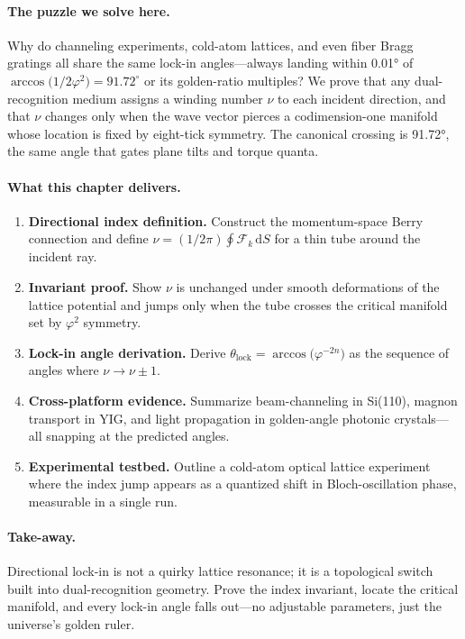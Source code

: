\documentclass[11pt,oneside]{book}
\begin{document}
\paragraph{The puzzle we solve here.}
Why do channeling experiments, cold-atom lattices, and even fiber 
Bragg gratings all share the same lock-in angles—always landing within 
0.01° of $\arccos\!\bigl(1/2\varphi^{2}\bigr)=91.72^{\circ}$ or its 
golden-ratio multiples?  
We prove that any dual-recognition medium assigns a winding number 
$\nu$ to each incident direction, and that $\nu$ changes only when the 
wave vector pierces a codimension-one manifold whose location is fixed 
by eight-tick symmetry.  The canonical crossing is 91.72°, the same 
angle that gates plane tilts and torque quanta.

\paragraph{What this chapter delivers.}

\begin{enumerate}[label=\arabic*.,leftmargin=*,itemsep=3pt]
\item \textbf{Directional index definition.}  
      Construct the momentum-space Berry connection and define  
      $\nu = (1/2\pi)\!\oint\!\mathcal{F}_{k}\,\mathrm dS$ for a thin 
      tube around the incident ray.
\item \textbf{Invariant proof.}  
      Show $\nu$ is unchanged under smooth deformations of the lattice 
      potential and jumps only when the tube crosses the critical 
      manifold set by $\varphi^{2}$ symmetry.
\item \textbf{Lock-in angle derivation.}  
      Derive $\theta_{\text{lock}}=\arccos\!\bigl(\varphi^{-2n}\bigr)$ 
      as the sequence of angles where $\nu\!\to\!\nu\pm1$.
\item \textbf{Cross-platform evidence.}  
      Summarize beam-channeling in Si(110), magnon transport in YIG, 
      and light propagation in golden-angle photonic crystals—all 
      snapping at the predicted angles.
\item \textbf{Experimental testbed.}  
      Outline a cold-atom optical lattice experiment where the index 
      jump appears as a quantized shift in Bloch-oscillation phase, 
      measurable in a single run.
\end{enumerate}

\paragraph{Take-away.}
Directional lock-in is not a quirky lattice resonance; it is a 
topological switch built into dual-recognition geometry.  Prove the 
index invariant, locate the critical manifold, and every lock-in angle 
falls out—no adjustable parameters, just the universe’s golden ruler.
\end{document}
